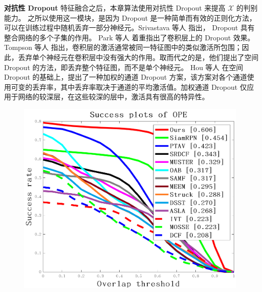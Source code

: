 \textbf{对抗性 Dropout} 特征融合之后，本章算法使用对抗性 Dropout \cite{park2018adversarial, lee2019drop} 来提高 $\mathcal{X}$ 的判别能力。
之所以使用这一模块，是因为 Dropout 是一种简单而有效的正则化方法，可以在训练过程中随机丢弃一部分神经元。Srivastava 等人 \cite{srivastava2014dropout} 指出， Dropout 具有整合网络的多个子集的作用。 Park 等人 \cite{park2016analysis} 着重指出了卷积层上的 Dropout 效果。Tompson 等人 \cite{tompson2015efficient} 指出，卷积层的激活通常被同一特征图中的类似激活所包围；因此，丢弃单个神经元在卷积层中没有强大的作用。取而代之的是，他们提出了空间 Dropout 的方法，即丢弃整个特征图，而不是单个神经元。 Hou 等人 \cite{hou2019weighted} 在空间 Dropout 的基础上，提出了一种加权的通道 Dropout 方案，该方案对各个通道使用可变的丢弃率，其中丢弃率取决于通道的平均激活值。加权通道 Dropout 仅应用于网络的较深层，在这些较深的层中，激活具有很高的特异性。
\begin{figure}[t]
\begin{minipage}{0.48\textwidth}
  \centering
  \centerline{\includegraphics[width=0.99\textwidth]{Img/end/quality_plot_overlap_OPE_AUC.png}}
\end{minipage}
\hfill
\begin{minipage}{0.48\textwidth}
  \centering

\end{minipage}
\end{figure}
